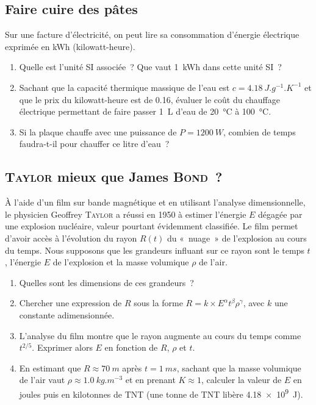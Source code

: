 \documentclass[a4paper, 12pt, final, garamond]{book}
\begin{document}
\subsection{Faire cuire des pâtes}
Sur une facture d'électricité, on peut lire sa consommation d'énergie électrique
exprimée en \si{kWh} (kilowatt-heure).
\begin{enumerate}
    \item Quelle est l'unité SI associée~? Que vaut \SI{1}{kWh} dans cette unité
        SI~?
    \item Sachant que la capacité thermique massique de l'eau est $c = \SI{4.18}{J.g^{-1}.K^{-1}}$ et que le prix du
    kilowatt-heure est de \SI{0.16}{\EUR}, évaluer le coût du chauffage électrique
    permettant de faire passer \SI{1}{L} d'eau de \SI{20}{\degreeCelsius} à
    \SI{100}{\degreeCelsius}.
\item Si la plaque chauffe avec une puissance de $P = \SI{1200}{W}$, combien de
    temps faudra-t-il pour chauffer ce litre d'eau~?
\end{enumerate}

\subsection{\textsc{Taylor} mieux que James \textsc{Bond}~?}

À l'aide d'un film sur bande magnétique et en utilisant l'analyse
dimensionnelle, le physicien Geoffrey \textsc{Taylor} a réussi en 1950 à estimer
l'énergie $E$ dégagée par une explosion nucléaire, valeur pourtant évidemment
classifiée. Le film permet d'avoir accès à l'évolution du rayon $R(t)$ du
«~nuage~» de l'explosion au cours du temps. Nous supposons que les grandeurs
influant sur ce rayon sont le temps $t$, l'énergie $E$ de l'explosion et la
masse volumique $\rho$ de l'air.
\begin{enumerate}
    \item Quelles sont les dimensions de ces grandeurs~?
    \item Chercher une expression de $R$ sous la forme $R = k\times
        E^{\alpha}t^\beta\rho^\gamma$, avec $k$ une constante adimensionnée.
    \item L'analyse du film montre que le rayon augmente au cours du temps comme
        $t^{2/5}$. Exprimer alors $E$ en fonction de $R$, $\rho$ et $t$.
    \item En estimant que $R\approx \SI{70}{m}$ après $t = \SI{1}{ms}$, sachant
        que la masse volumique de l'air vaut $\rho\approx \SI{1.0}{kg.m^{-3}}$
        et en prenant $K\approx 1$, calculer la valeur de $E$ en joules puis en
        kilotonnes de TNT (une tonne de TNT libère \SI{4.18e9}{J}).
\end{enumerate}
\end{document}
